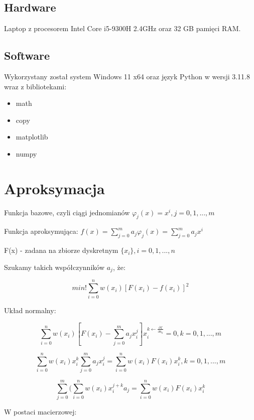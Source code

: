 \documentclass{article}
\begin{document}
\subsection{Hardware}

Laptop z procesorem Intel Core i5-9300H 2.4GHz oraz 32 GB pamięci RAM.

\subsection{Software}

Wykorzystany został system Windows 11 x64 oraz język Python w wersji 3.11.8 wraz z bibliotekami:
\begin{itemize}
\item math
\item copy
\item matplotlib
\item numpy
\end{itemize}

\newpage

\section{Aproksymacja}

\noindent
Funkcja bazowe, czyli ciągi jednomianów \(\varphi _j(x) = x^i, j = 0, 1, ..., m\)

\noindent
Funkcja aproksymująca: \(f(x) = \sum_{j=0}^{m}a_j\varphi_j(x) = \sum_{j=0}^{m}a_jx^i\)

\noindent
F(x) - zadana na zbiorze dyskretnym \(\{x_i\}, i = 0, 1, ..., n\)

\noindent
Szukamy takich współczynników \(a_j\), że:

\[min!\sum_{i=0}^{n}w(x_i)[F(x_i) - f(x_i)]^2\]

\noindent
Układ normalny:

\[\sum_{i = 0}^{n}w(x_i)[F(x_i) - \sum_{j=0}^{m}a_jx_i^j]x_i^{k\longleftarrow \frac{\partial f}{\partial a_k}} = 0, k = 0, 1, ..., m\]

\[\sum_{i = 0}^{n}w(x_i)x_i^k\sum_{j=0}^{m}a_jx_i^j = \sum_{i=0}^{n}w(x_i)F(x_i)x_i^k, k =0,1,...,m\]

\[\sum_{j=0}^{m}(\sum_{i=0}^{n}w(x_i)x_i^{j+k}a_j = \sum_{i=0}^{n}w(x_i)F(x_i)x_i^k\]

\noindent
W postaci macierzowej:
\end{document}
